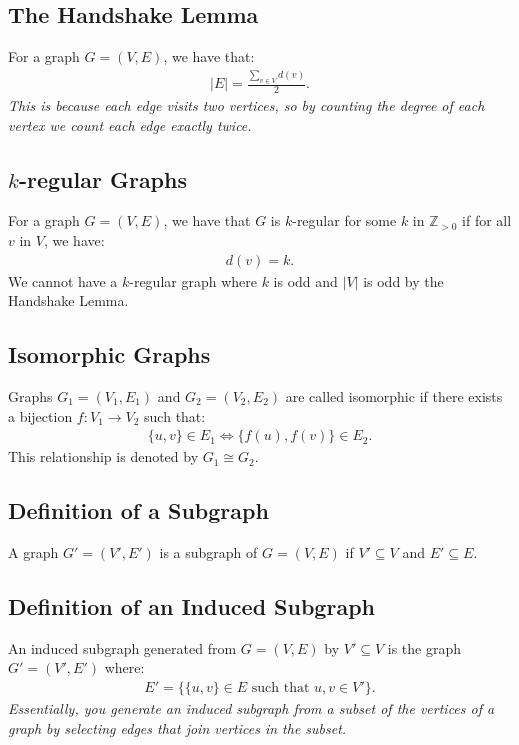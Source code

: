 \documentclass[a4paper, 12pt, twoside]{article}
\begin{document}
\subsection{The Handshake Lemma}

For a graph $G = (V, E)$, we have that: \begin{gather*}
  |E| = \frac{\sum_{v \in V} d(v)}{2}.
\end{gather*} \textit{This is because each edge visits two vertices,
so by counting the degree of each vertex we count each edge exactly
twice.}

\newpage

\subsection{$k$-regular Graphs}

For a graph $G = (V, E)$, we have that $G$ is $k$-regular for some
$k$ in $\mathbb{Z}_{>0}$ if for all $v$ in $V$, we have: \begin{gather*}
  d(v) = k.
\end{gather*} We cannot have a $k$-regular graph where $k$ is odd
and $|V|$ is odd by the Handshake Lemma.

\subsection{Isomorphic Graphs}

Graphs $G_1 = (V_1, E_1)$ and $G_2 = (V_2, E_2)$ are called 
isomorphic if there exists a bijection $f : V_1 \to V_2$ such
that: \begin{gather*}
  \{u, v\} \in E_1 \Longleftrightarrow \{f(u), f(v)\} \in E_2.
\end{gather*} This relationship is denoted by $G_1 \cong G_2$.

\subsection{Definition of a Subgraph}

A graph $G' = (V', E')$ is a subgraph of $G = (V, E)$ if
$V' \subseteq V$ and $E' \subseteq E$.

\subsection{Definition of an Induced Subgraph}

An induced subgraph generated from $G = (V, E)$ by $V' \subseteq V$
is the graph $G' = (V', E')$ where: \begin{gather*} 
  E' = \{\{u, v\} \in E \text{ such that } u, v \in V'\}.
\end{gather*} \textit{Essentially, you generate an induced
subgraph from a subset of the vertices of a graph by selecting
edges that join vertices in the subset.}
\end{document}
